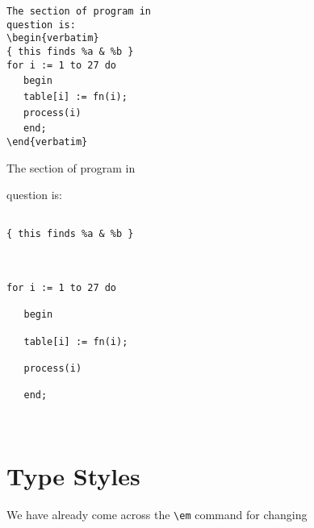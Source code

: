 \begin{flushleft}

\verb|The section of program in|  \\

\verb|question is:|               \\

\verb|\begin{verbatim}|           \\

\verb|{ this finds %a & %b }|     \\[2ex]



\verb|for i := 1 to 27 do|        \\

\ \ \ \verb|begin|                \\

\ \ \ \verb|table[i] := fn(i);|   \\

\ \ \ \verb|process(i)|           \\

\ \ \ \verb|end;|                 \\

\verb|\end{verbatim}|

\end{flushleft}

\egmid%

The section of program in

question is:

\begin{verbatim}

{ this finds %a & %b }



for i := 1 to 27 do

   begin

   table[i] := fn(i);

   process(i)

   end;



\end{verbatim}

\egend



\section{Type Styles}



We have already come across the \verb|\em| command for changing


